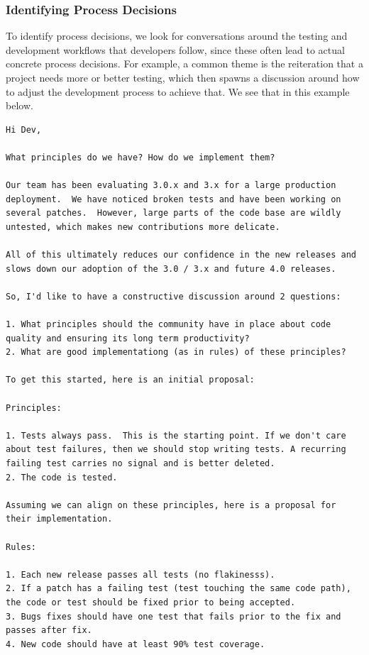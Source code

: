 \documentclass[a4paper, 12pt]{article}
\begin{document}
		\subsubsection{Identifying \textbf{Process} Decisions}
			To identify process decisions, we look for conversations around the testing and development workflows that developers follow, since these often lead to actual concrete process decisions. For example, a common theme is the reiteration that a project needs more or better testing, which then spawns a discussion around how to adjust the development process to achieve that. We see that in this example below.
			\begin{verbatim}
Hi Dev,

What principles do we have? How do we implement them?

Our team has been evaluating 3.0.x and 3.x for a large production deployment.  We have noticed broken tests and have been working on several patches.  However, large parts of the code base are wildly untested, which makes new contributions more delicate.

All of this ultimately reduces our confidence in the new releases and slows down our adoption of the 3.0 / 3.x and future 4.0 releases.

So, I'd like to have a constructive discussion around 2 questions:

1. What principles should the community have in place about code quality and ensuring its long term productivity?
2. What are good implementationg (as in rules) of these principles?

To get this started, here is an initial proposal:

Principles:

1. Tests always pass.  This is the starting point. If we don't care about test failures, then we should stop writing tests. A recurring failing test carries no signal and is better deleted.
2. The code is tested.

Assuming we can align on these principles, here is a proposal for their implementation.

Rules:

1. Each new release passes all tests (no flakinesss).
2. If a patch has a failing test (test touching the same code path), the code or test should be fixed prior to being accepted.
3. Bugs fixes should have one test that fails prior to the fix and passes after fix.
4. New code should have at least 90% test coverage.
			\end{verbatim}
\end{document}
